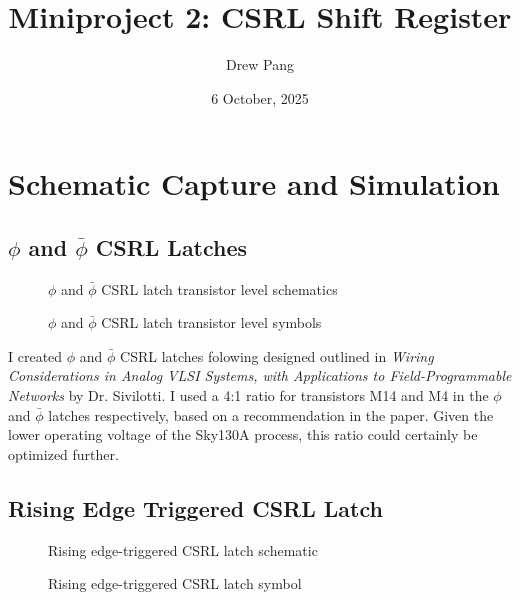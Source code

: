 \documentclass[11pt]{article}
\title{Miniproject 2: CSRL Shift Register}
\author{Drew Pang }
\date{6 October, 2025}
\begin{document}
\maketitle

\section*{Schematic Capture and Simulation}

\subsection*{$\phi$ and $\bar{\phi}$  CSRL Latches}

\begin{figure}[H]
  \centering
  
  
  \caption{$\phi$ and $\bar{\phi}$ CSRL latch transistor level schematics}
\end{figure}

\begin{figure}[H]
  \centering
  
  
  \caption{$\phi$ and $\bar{\phi}$ CSRL latch transistor level symbols}
\end{figure}

I created $\phi$ and $\bar{\phi}$ CSRL latches folowing designed outlined in \textit{Wiring Considerations in Analog VLSI Systems, with Applications to Field-Programmable Networks} by Dr. Sivilotti. I used a 4:1 ratio for transistors M14 and M4 in the $\phi$ and $\bar{\phi}$ latches respectively, based on a recommendation in the paper. Given the lower operating voltage of the Sky130A process, this ratio could certainly be optimized further. 

\subsection*{Rising Edge Triggered CSRL Latch}

\begin{figure}[H]
  \centering
  
  \caption{Rising edge-triggered CSRL latch schematic}
\end{figure}

\begin{figure}[H]
  \centering
  
  \caption{Rising edge-triggered CSRL latch symbol}
\end{figure}
\end{document}
